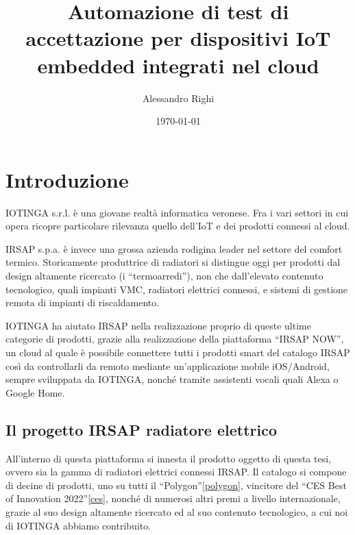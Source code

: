 \documentclass[a4paper,titlepage]{article}
\title{Automazione di test di accettazione per dispositivi IoT embedded integrati nel cloud}
\author{Alessandro Righi}
\date{\today}
\begin{document}
\begin{frontespizio}
\end{frontespizio}
\tableofcontents
\pagebreak

\section{Introduzione}

IOTINGA s.r.l. è una giovane realtà informatica veronese. Fra i vari settori in cui
opera ricopre particolare rilevanza quello dell'IoT e dei prodotti connessi al cloud.

IRSAP s.p.a. è invece una grossa azienda rodigina leader nel settore del comfort termico.
Storicamente produttrice di radiatori si distingue oggi per prodotti dal design altamente
ricercato (i ``termoarredi''), non che dall'elevato contenuto tecnologico, quali
impianti VMC, radiatori elettrici connessi, e sistemi di gestione remota di impianti di riscaldamento.

IOTINGA ha aiutato IRSAP nella realizzazione proprio di queste ultime categorie di
prodotti, grazie alla realizzazione della piattaforma ``IRSAP NOW'', un cloud
al quale è possibile connettere tutti i prodotti smart del catalogo IRSAP così da controllarli
da remoto mediante un'applicazione mobile iOS/Android, sempre sviluppata da IOTINGA,
nonché tramite assistenti vocali quali Alexa o Google Home.

\subsection{Il progetto IRSAP radiatore elettrico}

All'interno di questa piattaforma si innesta il prodotto oggetto di questa tesi,
ovvero sia la gamma di radiatori elettrici connessi IRSAP. Il catalogo si compone di
decine di prodotti, uno su tutti il ``Polygon''\ref{polygon}, vincitore del ``CES Best of Innovation 2022''\ref{ces},
nonché di numerosi altri premi a livello internazionale, grazie al suo design
altamente ricercato ed al suo contenuto tecnologico, a cui noi di IOTINGA abbiamo contribuito.
\end{document}
